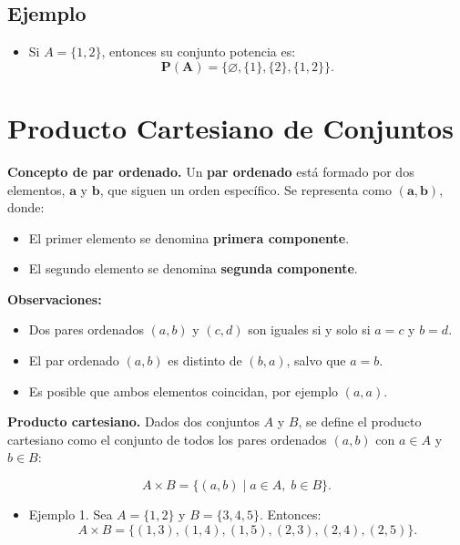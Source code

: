 \documentclass[12pt]{article}
\begin{document}
\subsection*{Ejemplo}
\begin{itemize}
    \item Si $A = \{1, 2\}$, entonces su conjunto potencia es:
$$\mathbf{P(A)}=\{\varnothing,\{1\},\{2\},\{1,2\}\}.
$$ 
\end{itemize}

\section{Producto Cartesiano de Conjuntos}



\textbf{Concepto de par ordenado.}  
Un \textbf{par ordenado }está formado por dos elementos, $\mathbf{a}$ y $\mathbf{b}$, que siguen un orden específico.  
Se representa como $\mathbf{(a, b)}$, donde:
\begin{itemize}
    \item El primer elemento se denomina \textbf{primera componente}.
    \item El segundo elemento se denomina \textbf{segunda componente}.
\end{itemize}

\textbf{Observaciones:}
\begin{itemize}
    \item Dos pares ordenados $(a, b)$ y $(c, d)$ son iguales si y solo si $a = c$ y $b = d$.
    \item El par ordenado $(a, b)$ es distinto de $(b, a)$, salvo que $a = b$.
    \item Es posible que ambos elementos coincidan, por ejemplo $(a, a)$.
\end{itemize}

\textbf{Producto cartesiano.}  
Dados dos conjuntos $A$ y $B$, se define el producto cartesiano como el conjunto de todos los pares ordenados $(a, b)$ con $a \in A$ y $b \in B$:

\[
A \times B = \{(a, b) \mid a \in A, \; b \in B\}.
\]

\begin{itemize}
    \item Ejemplo 1. Sea $A = \{1, 2\}$ y $B = \{3, 4, 5\}$. Entonces:
\[
A \times B = \{(1, 3), (1, 4), (1, 5), (2, 3), (2, 4), (2, 5)\}.
\]
\end{itemize}
  
\end{document}
